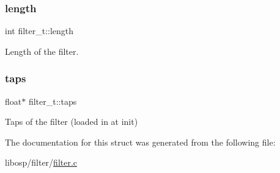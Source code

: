 \mbox{\label{structfilter__t_a8b47a8b9661b7ebcad76afd55452b992}} 
\subsubsection{\texorpdfstring{length}{length}}
{\footnotesize\ttfamily int filter\+\_\+t\+::length}



Length of the filter. 

\mbox{\label{structfilter__t_a4d1dbe72019d23a1c4cb7621cfb5f7c7}} 
\subsubsection{\texorpdfstring{taps}{taps}}
{\footnotesize\ttfamily float$\ast$ filter\+\_\+t\+::taps}



Taps of the filter (loaded in at init) 



The documentation for this struct was generated from the following file\+:\begin{DoxyCompactItemize}
\item 
libosp/filter/\mbox{\hyperlink{filter_8c}{filter.\+c}}\end{DoxyCompactItemize}
